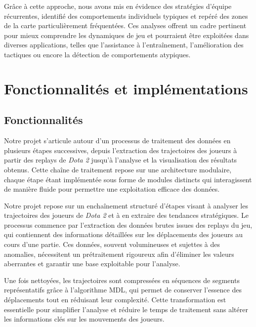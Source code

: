 \documentclass{article}
\begin{document}
        Grâce à cette approche, nous avons mis en évidence des stratégies d'équipe récurrentes, identifié des comportements individuels typiques et repéré des zones de la carte particulièrement fréquentées. Ces analyses offrent un cadre pertinent pour mieux comprendre les dynamiques de jeu et pourraient être exploitées dans diverses applications, telles que l'assistance à l'entraînement, l'amélioration des tactiques ou encore la détection de comportements atypiques. 
    
    
    \section{Fonctionnalités et implémentations}

        \subsection{Fonctionnalités}
    
        Notre projet s’articule autour d’un processus de traitement des données en plusieurs étapes successives, depuis l’extraction des trajectoires des joueurs à partir des replays de \textit{Dota 2} jusqu’à l’analyse et la visualisation des résultats obtenus. Cette chaîne de traitement repose sur une architecture modulaire, chaque étape étant implémentée sous forme de modules distincts qui interagissent de manière fluide pour permettre une exploitation efficace des données.
    
        Notre projet repose sur un enchaînement structuré d'étapes visant à analyser les trajectoires des joueurs de \textit{Dota 2} et à en extraire des tendances stratégiques. Le processus commence par l’extraction des données brutes issues des replays du jeu, qui contiennent des informations détaillées sur les déplacements des joueurs au cours d’une partie. Ces données, souvent volumineuses et sujettes à des anomalies, nécessitent un prétraitement rigoureux afin d’éliminer les valeurs aberrantes et garantir une base exploitable pour l’analyse.
    
        Une fois nettoyées, les trajectoires sont compressées en séquences de segments représentatifs grâce à l’algorithme MDL, qui permet de conserver l’essence des déplacements tout en réduisant leur complexité. Cette transformation est essentielle pour simplifier l’analyse et réduire le temps de traitement sans altérer les informations clés sur les mouvements des joueurs.
        
\end{document}
